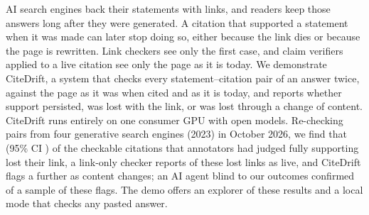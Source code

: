 AI search engines back their statements with links, and readers keep those answers long after they were generated. A citation that supported a statement when it was made can later stop doing so, either because the link dies or because the page is rewritten. Link checkers see only the first case, and claim verifiers applied to a live citation see only the page as it is today. We demonstrate CiteDrift, a system that checks every statement--citation pair of an answer twice, against the page as it was when cited and as it is today, and reports whether support persisted, was lost with the link, or was lost through a change of content. CiteDrift runs entirely on one consumer GPU with open models. Re-checking \nPairs pairs from four generative search engines (2023) in October 2026, we find that \linkLostRate (95\% CI \linkLostClusterCI) of the checkable citations that annotators had judged fully supporting lost their link, a link-only checker reports \uhLiveLinkLostPct of these lost links as live, and CiteDrift flags a further \changedRate as content changes; an AI agent blind to our outcomes confirmed \insChangedPrec of a sample of these flags. The demo offers an explorer of these results and a local mode that checks any pasted answer.
